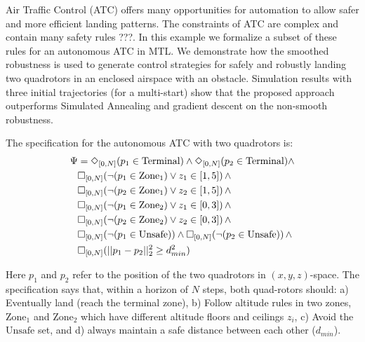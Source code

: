 
Air Traffic Control (ATC) offers many opportunities for automation to allow safer and more efficient landing patterns. 
The constraints of ATC are complex and contain many safety rules \cite{}???. 
In this example we formalize a subset of these rules for an autonomous ATC in MTL.
We demonstrate how the smoothed robustness is used to generate control strategies for safely and robustly landing two quadrotors in an enclosed airspace with an obstacle. 
Simulation results with three initial trajectories (for a multi-start) show that the proposed approach outperforms Simulated Annealing and gradient descent on the non-smooth robustness.

The specification for the autonomous ATC with two quadrotors is:
{\small
\begin{subequations}
\begin{align}
\Psi &= \Diamond_{[0,N]}(p_1 \in \text{Terminal}) \wedge \Diamond_{[0,N]}(p_2 \in \text{Terminal}) \wedge   \nonumber \\
& \square_{[0,N]} (\neg (p_1 \in \text{Zone}_1) \vee z_1 \in [1,5]) \, \wedge \nonumber \\
& \square_{[0,N]} (\neg (p_2 \in \text{Zone}_1) \vee z_2 \in [1,5]) \, \wedge \nonumber \\
& \square_{[0,N]} (\neg (p_1 \in \text{Zone}_2) \vee z_1 \in [0,3]) \, \wedge \nonumber \\
& \square_{[0,N]} (\neg (p_2 \in \text{Zone}_2) \vee z_2 \in [0,3]) \, \wedge \nonumber \\
& \square_{[0,N]} (\neg (p_1 \in \text{Unsafe})) \wedge \square_{[0,N]} (\neg (p_2 \in \text{Unsafe})) \, \wedge  \nonumber \\
& \square_{[0,N]} (||p_1-p_2||_2^2 \geq d_{min}^2)
\end{align}
\end{subequations}
}

Here $p_1$ and $p_2$ refer to the position of the two quadrotors in $(x,y,z)$-space. 
The specification says that, within a horizon of $N$ steps,  both quad-rotors 
should: 
a) Eventually land (reach the terminal zone), 
b) Follow altitude rules in two zones, $\text{Zone}_1$ and $\text{Zone}_2$ which have different altitude floors and ceilings $z_i$,
c) Avoid the $\text{Unsafe}$ set, and d) always maintain a safe distance between each other ($d_{min}$). 

